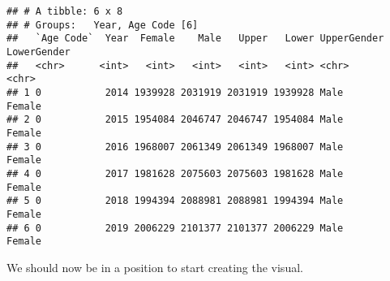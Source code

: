 \documentclass[]{article}
\newenvironment{Shaded}{\begin{snugshade}}{\end{snugshade}}
\newcommand{\KeywordTok}[1]{\textcolor[rgb]{0.13,0.29,0.53}{\textbf{#1}}}
\newcommand{\DataTypeTok}[1]{\textcolor[rgb]{0.13,0.29,0.53}{#1}}
\newcommand{\DecValTok}[1]{\textcolor[rgb]{0.00,0.00,0.81}{#1}}
\newcommand{\StringTok}[1]{\textcolor[rgb]{0.31,0.60,0.02}{#1}}
\newcommand{\CommentTok}[1]{\textcolor[rgb]{0.56,0.35,0.01}{\textit{#1}}}
\newcommand{\OperatorTok}[1]{\textcolor[rgb]{0.81,0.36,0.00}{\textbf{#1}}}
\newcommand{\NormalTok}[1]{#1}
\begin{document}
\begin{Shaded}
\end{Shaded}

\begin{verbatim}
## # A tibble: 6 x 8
## # Groups:   Year, Age Code [6]
##   `Age Code`  Year  Female    Male   Upper   Lower UpperGender LowerGender
##   <chr>      <int>   <int>   <int>   <int>   <int> <chr>       <chr>      
## 1 0           2014 1939928 2031919 2031919 1939928 Male        Female     
## 2 0           2015 1954084 2046747 2046747 1954084 Male        Female     
## 3 0           2016 1968007 2061349 2061349 1968007 Male        Female     
## 4 0           2017 1981628 2075603 2075603 1981628 Male        Female     
## 5 0           2018 1994394 2088981 2088981 1994394 Male        Female     
## 6 0           2019 2006229 2101377 2101377 2006229 Male        Female
\end{verbatim}

We should now be in a position to start creating the visual.

\begin{Shaded}
\end{Shaded}
\end{document}
